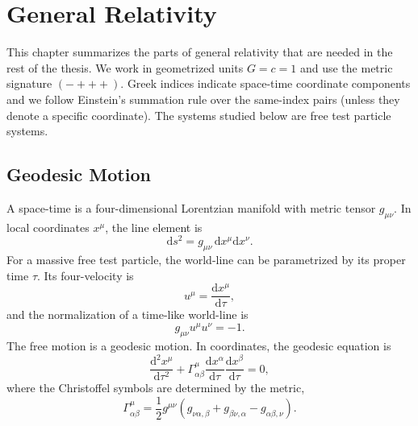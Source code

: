 \chapter{General Relativity}
\label{chap:general-relativity}

This chapter summarizes the parts of general relativity that are needed in the
rest of the thesis. We work in geometrized units \(G=c=1\) and use the metric
signature \((-+++)\). Greek indices
indicate space-time coordinate components and we follow Einstein’s summation
rule over the same-index pairs (unless they denote a specific coordinate). The systems studied below are free test particle systems.

\section{Geodesic Motion}
\label{sec:geodesic-motion}

A space-time is a four-dimensional Lorentzian manifold with metric tensor
\(g_{\mu\nu}\). In local coordinates \(x^\mu\), the line element is
\begin{equation}
    \mathrm{d}s^2
    =
    g_{\mu\nu}\,\mathrm{d}x^\mu\mathrm{d}x^\nu .
    \label{eq:line-element}
\end{equation}
For a massive free test particle, the world-line can be parametrized by its
proper time \(\tau\). Its four-velocity is
\begin{equation}
    u^\mu
    =
    \frac{\mathrm{d}x^\mu}{\mathrm{d}\tau},
    \label{eq:four-velocity}
\end{equation}
and the normalization of a time-like world-line is
\begin{equation}
    g_{\mu\nu}u^\mu u^\nu=-1.
    \label{eq:time-like-normalization-chap2}
\end{equation}
The free motion is a geodesic motion. In coordinates, the geodesic equation is
\begin{equation}
    \frac{\mathrm{d}^2x^\mu}{\mathrm{d}\tau^2}
    +
    \Gamma^\mu_{\alpha\beta}
    \frac{\mathrm{d}x^\alpha}{\mathrm{d}\tau}
    \frac{\mathrm{d}x^\beta}{\mathrm{d}\tau}
    =
    0,
    \label{eq:geodesic-equation}
\end{equation}
where the Christoffel symbols are determined by the metric,
\begin{equation}
    \Gamma^\mu_{\alpha\beta}
    =
    \frac{1}{2}g^{\mu\nu}
    \left(
        g_{\nu\alpha,\beta}
        +
        g_{\beta\nu,\alpha}
        -
        g_{\alpha\beta,\nu}
    \right).
    \label{eq:christoffel-symbols}
\end{equation}
\cite{BicakSemerak2026}

